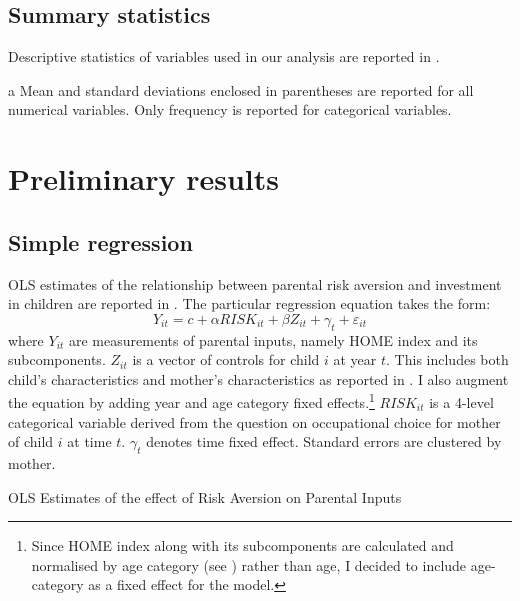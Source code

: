 \documentclass[]{article}
\begin{document}
\subsection{Summary statistics}
Descriptive statistics of variables used in our analysis are reported in . 

\begin{ThreePartTable}
	\centering
	\setlength{\extrarowheight}{0.2em}
	\begin{TableNotes}\footnotesize
		\item[a] Mean and standard deviations enclosed in parentheses are reported for all numerical variables. Only frequency is reported for categorical variables.
	\end{TableNotes}
	
\end{ThreePartTable}

\section{Preliminary results}
\subsection{Simple regression}
OLS estimates of the relationship between parental risk aversion and investment in children are reported in . The particular regression equation takes the form:
\begin{equation}
	Y_{it} = c + \alpha RISK_{it} + \beta Z_{it} + \gamma_t +  \varepsilon_{it}
\end{equation}
where $Y_{it}$ are measurements of parental inputs, namely HOME index and its subcomponents. $Z_{it}$ is a vector of controls for child $i$ at year $t$. This includes both child's characteristics and mother's characteristics as reported in . I also augment the equation by adding year and age category fixed effects.\footnote{Since HOME index along with its subcomponents are calculated and normalised by age category (see ) rather than age, I decided to include age-category as a fixed effect for the model.} $RISK_{it}$ is a 4-level categorical variable derived from the question on occupational choice for mother of child $i$ at time $t$. $\gamma_t$ denotes time fixed effect. Standard errors are clustered by mother. 

\begin{table}[!h]
	\centering \setlength{\extrarowheight}{0.1em}
	\caption{OLS Estimates of the effect of Risk Aversion on Parental Inputs}
	
	\label{table:4}
\end{table}
\end{document}
